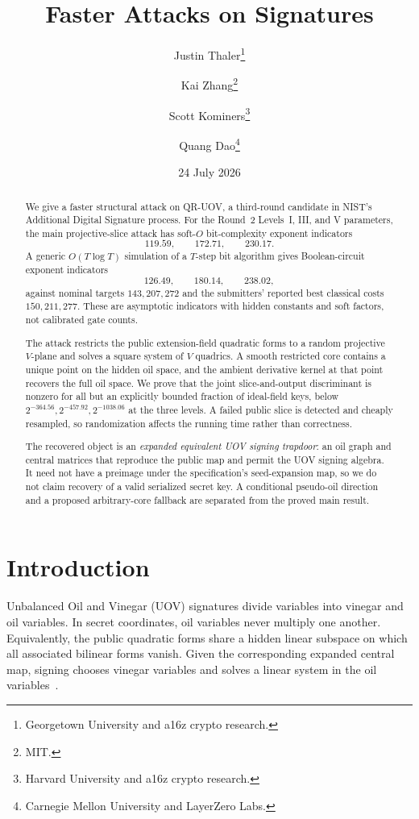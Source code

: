 \documentclass[10pt,a4paper]{article}
\title{\bfseries Faster Attacks on \QRUOV{} Signatures}
\author{Justin Thaler\thanks{Georgetown University and a16z crypto research.}
\and Kai Zhang\thanks{MIT.}
\and Scott Kominers\thanks{Harvard University and a16z crypto research.}
\and Quang Dao\thanks{Carnegie Mellon University and LayerZero Labs.}}
\date{24 July 2026}
\newcommand{\QRUOV}{\textsf{QR-UOV}}
\begin{document}
\maketitle

\begin{abstract}
We give a faster structural attack on \QRUOV{}, a third-round candidate in NIST's Additional Digital Signature process.  For the Round~2 Levels~I, III, and V parameters, the main projective-slice attack has soft-$O$ bit-complexity exponent indicators
\[
119.59,\qquad 172.71,\qquad 230.17.
\]
A generic $O(T\log T)$ simulation of a $T$-step bit algorithm gives Boolean-circuit exponent indicators
\[
126.49,\qquad 180.14,\qquad 238.02,
\]
against nominal targets $143,207,272$ and the submitters' reported best classical costs $150,211,277$.  These are asymptotic indicators with hidden constants and soft factors, not calibrated gate counts.

The attack restricts the public extension-field quadratic forms to a random projective $V$-plane and solves a square system of $V$ quadrics.  A smooth restricted core contains a unique point on the hidden oil space, and the ambient derivative kernel at that point recovers the full oil space.  We prove that the joint slice-and-output discriminant is nonzero for all but an explicitly bounded fraction of ideal-field keys, below $2^{-364.56},2^{-457.92},2^{-1038.06}$ at the three levels.  A failed public slice is detected and cheaply resampled, so randomization affects the running time rather than correctness.

The recovered object is an \emph{expanded equivalent UOV signing trapdoor}: an oil graph and central matrices that reproduce the public map and permit the UOV signing algebra.  It need not have a preimage under the specification's seed-expansion map, so we do not claim recovery of a valid serialized secret key.  A conditional pseudo-oil direction and a proposed arbitrary-core fallback are separated from the proved main result.
\end{abstract}


\section{Introduction}\label{sec:intro}

Unbalanced Oil and Vinegar (UOV) signatures divide variables into vinegar and oil variables.  In secret coordinates, oil variables never multiply one another.  Equivalently, the public quadratic forms share a hidden linear subspace on which all associated bilinear forms vanish.  Given the corresponding expanded central map, signing chooses vinegar variables and solves a linear system in the oil variables~\cite{KPG1999}.
\end{document}
